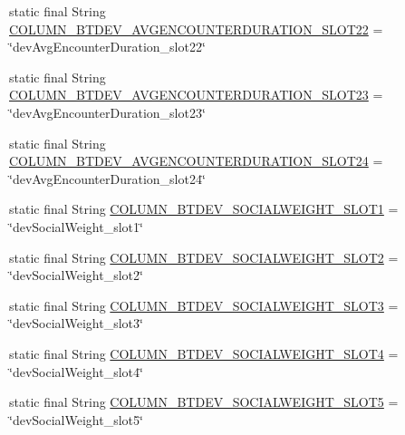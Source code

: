 \begin{DoxyCompactItemize}
\item 
static final String \hyperlink{classcom_1_1copelabs_1_1oiframework_1_1socialproximity_1_1_s_q_lite_helper_af39df97c5b8fa0555b77939576ce99ad}{C\+O\+L\+U\+M\+N\+\_\+\+B\+T\+D\+E\+V\+\_\+\+A\+V\+G\+E\+N\+C\+O\+U\+N\+T\+E\+R\+D\+U\+R\+A\+T\+I\+O\+N\+\_\+\+S\+L\+O\+T22} = \char`\"{}dev\+Avg\+Encounter\+Duration\+\_\+slot22\char`\"{}
\item 
static final String \hyperlink{classcom_1_1copelabs_1_1oiframework_1_1socialproximity_1_1_s_q_lite_helper_a66a3f8b1a39c766a245b6aaa3286ac2e}{C\+O\+L\+U\+M\+N\+\_\+\+B\+T\+D\+E\+V\+\_\+\+A\+V\+G\+E\+N\+C\+O\+U\+N\+T\+E\+R\+D\+U\+R\+A\+T\+I\+O\+N\+\_\+\+S\+L\+O\+T23} = \char`\"{}dev\+Avg\+Encounter\+Duration\+\_\+slot23\char`\"{}
\item 
static final String \hyperlink{classcom_1_1copelabs_1_1oiframework_1_1socialproximity_1_1_s_q_lite_helper_ab53bcc182261afe6049fbf21d2b78bcf}{C\+O\+L\+U\+M\+N\+\_\+\+B\+T\+D\+E\+V\+\_\+\+A\+V\+G\+E\+N\+C\+O\+U\+N\+T\+E\+R\+D\+U\+R\+A\+T\+I\+O\+N\+\_\+\+S\+L\+O\+T24} = \char`\"{}dev\+Avg\+Encounter\+Duration\+\_\+slot24\char`\"{}
\item 
static final String \hyperlink{classcom_1_1copelabs_1_1oiframework_1_1socialproximity_1_1_s_q_lite_helper_a80219e5fd45b8c4b9d40d28f5af0f9bf}{C\+O\+L\+U\+M\+N\+\_\+\+B\+T\+D\+E\+V\+\_\+\+S\+O\+C\+I\+A\+L\+W\+E\+I\+G\+H\+T\+\_\+\+S\+L\+O\+T1} = \char`\"{}dev\+Social\+Weight\+\_\+slot1\char`\"{}
\item 
static final String \hyperlink{classcom_1_1copelabs_1_1oiframework_1_1socialproximity_1_1_s_q_lite_helper_a2ed802bd725b28c7db4a48e763fcdab6}{C\+O\+L\+U\+M\+N\+\_\+\+B\+T\+D\+E\+V\+\_\+\+S\+O\+C\+I\+A\+L\+W\+E\+I\+G\+H\+T\+\_\+\+S\+L\+O\+T2} = \char`\"{}dev\+Social\+Weight\+\_\+slot2\char`\"{}
\item 
static final String \hyperlink{classcom_1_1copelabs_1_1oiframework_1_1socialproximity_1_1_s_q_lite_helper_a052288f997cdfa0cb4d22d99aea9daca}{C\+O\+L\+U\+M\+N\+\_\+\+B\+T\+D\+E\+V\+\_\+\+S\+O\+C\+I\+A\+L\+W\+E\+I\+G\+H\+T\+\_\+\+S\+L\+O\+T3} = \char`\"{}dev\+Social\+Weight\+\_\+slot3\char`\"{}
\item 
static final String \hyperlink{classcom_1_1copelabs_1_1oiframework_1_1socialproximity_1_1_s_q_lite_helper_a6eb4180bb35f069af2cb5840a9d0954a}{C\+O\+L\+U\+M\+N\+\_\+\+B\+T\+D\+E\+V\+\_\+\+S\+O\+C\+I\+A\+L\+W\+E\+I\+G\+H\+T\+\_\+\+S\+L\+O\+T4} = \char`\"{}dev\+Social\+Weight\+\_\+slot4\char`\"{}
\item 
static final String \hyperlink{classcom_1_1copelabs_1_1oiframework_1_1socialproximity_1_1_s_q_lite_helper_a35fdea94610378cd5967262bd9b4fad7}{C\+O\+L\+U\+M\+N\+\_\+\+B\+T\+D\+E\+V\+\_\+\+S\+O\+C\+I\+A\+L\+W\+E\+I\+G\+H\+T\+\_\+\+S\+L\+O\+T5} = \char`\"{}dev\+Social\+Weight\+\_\+slot5\char`\"{}

\end{DoxyCompactItemize}
